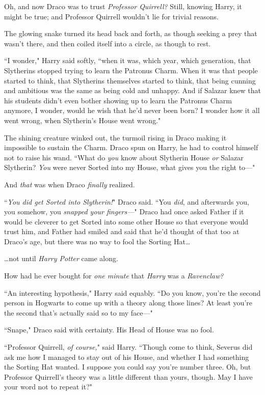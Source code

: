 Oh, and now Draco was to trust \emph{Professor Quirrell?} Still, knowing Harry, it might be true; and Professor Quirrell wouldn't lie for trivial reasons.

The glowing snake turned its head back and forth, as though seeking a prey that wasn't there, and then coiled itself into a circle, as though to rest.

``I wonder," Harry said softly, ``when it was, which year, which generation, that Slytherins stopped trying to learn the Patronus Charm. When it was that people started to think, that Slytherins themselves started to think, that being cunning and ambitious was the same as being cold and unhappy. And if Salazar knew that his students didn't even bother showing up to learn the Patronus Charm anymore, I wonder, would he wish that he'd never been born? I wonder how it all went wrong, when Slytherin's House went wrong."

The shining creature winked out, the turmoil rising in Draco making it impossible to sustain the Charm. Draco spun on Harry, he had to control himself not to raise his wand. ``What do \emph{you} know about Slytherin House \emph{or} Salazar Slytherin? \emph{You} were never Sorted into my House, what gives you the right to—"

And \emph{that} was when Draco \emph{finally} realized.

``\emph{You did get Sorted into Slytherin!}" Draco said. ``You \emph{did}, and afterwards you, you somehow, you \emph{snapped your fingers—}" Draco had once asked Father if it would be cleverer to get Sorted into some other House so that everyone would trust him, and Father had smiled and said that he'd thought of that too at Draco's age, but there was no way to fool the Sorting Hat{\ldots}

{\ldots}not until \emph{Harry Potter} came along.

How had he ever bought for \emph{one minute} that \emph{Harry} was a \emph{Ravenclaw?}

``An interesting hypothesis," Harry said equably. ``Do you know, you're the second person in Hogwarts to come up with a theory along those lines? At least you're the second that's actually said so to my face—"

``Snape," Draco said with certainty. His Head of House was no fool.

``Professor Quirrell, \emph{of course,}" said Harry. ``Though come to think, Severus did ask me how I managed to stay out of his House, and whether I had something the Sorting Hat wanted. I suppose you could say you're number three. Oh, but Professor Quirrell's theory was a little different than yours, though. May I have your word not to repeat it?"

